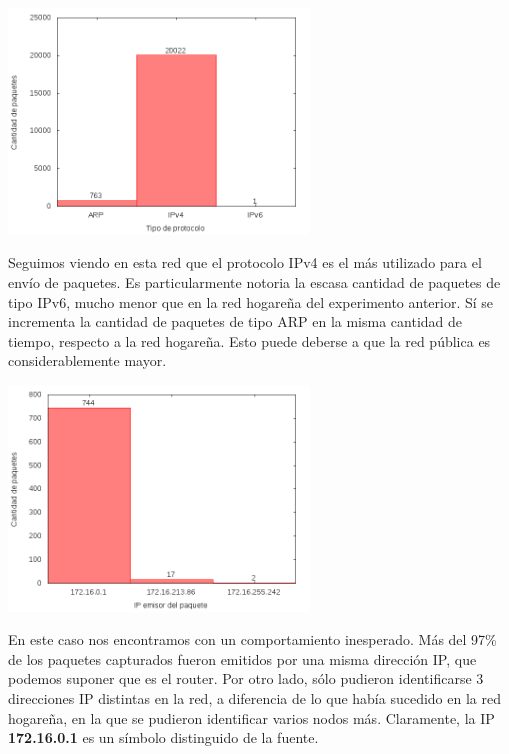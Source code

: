 \begin{center}
\includegraphics[width=8cm]{../mediciones/altop-wifi-10/altop10Protocolos.png}
\end{center}

Seguimos viendo en esta red que el protocolo IPv4 es el más utilizado para el envío de paquetes. Es particularmente notoria la escasa
cantidad de paquetes de tipo IPv6, mucho menor que en la red hogareña del experimento anterior. Sí se incrementa la cantidad de paquetes
de tipo ARP en la misma cantidad de tiempo, respecto a la red hogareña. Esto puede deberse a que la red pública es considerablemente mayor.

\begin{center}
\includegraphics[width=8cm]{../mediciones/altop-wifi-10/altop10IpsSrcArp.png}
\end{center}

En este caso nos encontramos con un comportamiento inesperado. Más del 97\% de los paquetes capturados fueron emitidos por una misma dirección
IP, que podemos suponer que es el router. Por otro lado, sólo pudieron identificarse 3 direcciones IP distintas en la red, a diferencia de lo
que había sucedido en la red hogareña, en la que se pudieron identificar varios nodos más. Claramente, la IP \textbf{172.16.0.1} es un símbolo
distinguido de la fuente.

